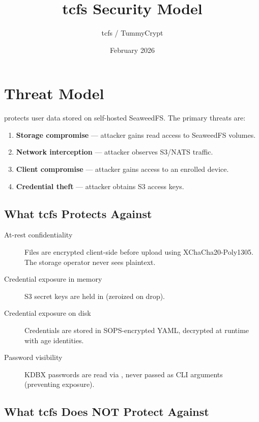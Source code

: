 \documentclass[11pt,a4paper]{article}
\title{tcfs Security Model}
\author{tcfs / TummyCrypt}
\date{February 2026}
\begin{document}
\maketitle
\tableofcontents
\newpage

\section{Threat Model}

\tcfs{} protects user data stored on self-hosted SeaweedFS. The primary threats
are:

\begin{enumerate}
  \item \textbf{Storage compromise} --- attacker gains read access to SeaweedFS
        volumes.
  \item \textbf{Network interception} --- attacker observes S3/NATS traffic.
  \item \textbf{Client compromise} --- attacker gains access to an enrolled device.
  \item \textbf{Credential theft} --- attacker obtains S3 access keys.
\end{enumerate}

\subsection{What tcfs Protects Against}

\begin{description}
  \item[At-rest confidentiality] Files are encrypted client-side before upload
    using XChaCha20-Poly1305. The storage operator never sees plaintext.
  \item[Credential exposure in memory] S3 secret keys are held in
     (zeroized on drop).
  \item[Credential exposure on disk] Credentials are stored in SOPS-encrypted
    YAML, decrypted at runtime with age identities.
  \item[Password visibility] KDBX passwords are read via ,
    never passed as CLI arguments (preventing  exposure).
\end{description}

\subsection{What tcfs Does NOT Protect Against}
\end{document}
